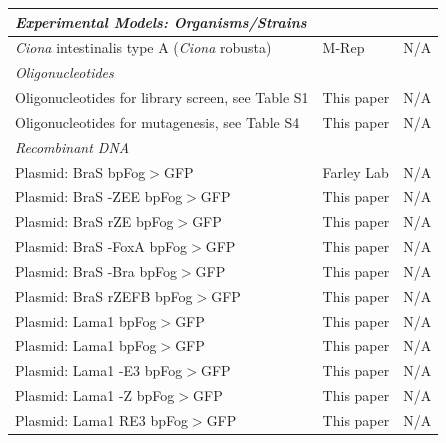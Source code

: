 \begin{landscape}
\begin{longtable}{p{} p{} p{}}
        \hline \textit{Experimental Models: Organisms/Strains} \\ \hline
        \textit{Ciona} intestinalis type A (\textit{Ciona} robusta) & M-Rep & N/A \\

        \hline \textit{Oligonucleotides} \\ \hline
        Oligonucleotides for library screen, see Table S1 & This paper & N/A \\
        Oligonucleotides for mutagenesis, see Table S4 & This paper & N/A \\

        \hline \textit{Recombinant DNA} \\ \hline
        Plasmid: BraS bpFog$>$GFP & Farley Lab & N/A \\ 
        Plasmid: BraS -ZEE bpFog$>$GFP & This paper & N/A \\
        Plasmid: BraS rZE bpFog$>$GFP & This paper & N/A \\
        Plasmid: BraS -FoxA bpFog$>$GFP & This paper & N/A \\
        Plasmid: BraS -Bra bpFog$>$GFP & This paper & N/A \\ 
        Plasmid: BraS rZEFB bpFog$>$GFP & This paper & N/A \\
        Plasmid: Lama1 bpFog$>$GFP & This paper & N/A \\
        Plasmid: Lama1 bpFog$>$GFP & This paper & N/A \\
        Plasmid: Lama1 -E3 bpFog$>$GFP & This paper & N/A \\
        Plasmid: Lama1 -Z bpFog$>$GFP & This paper & N/A \\
        Plasmid: Lama1 RE3 bpFog$>$GFP & This paper & N/A \\


\end{longtable}
\end{landscape}
